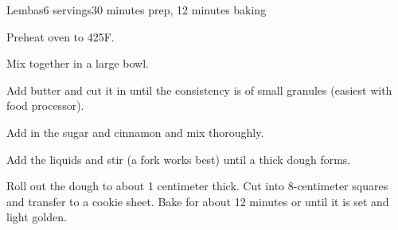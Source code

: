 \documentclass[../Cookbook.tex]{subfiles}
\begin{document}
\begin{recipe}{Lembas}{6 servings}{30 minutes prep, 12 minutes baking}

Preheat oven to 425\0F.

Mix together in a large bowl.

Add butter and cut it in until the consistency is of small granules (easiest with food processor).

Add in the sugar and cinnamon and mix thoroughly.

Add the liquids and stir (a fork works best) until a thick dough forms.

Roll out the dough to about 1 centimeter thick. Cut into 8-centimeter squares and transfer to a cookie sheet. Bake for about 12 minutes or until it is set and light golden.

\end{recipe}
\end{document}
